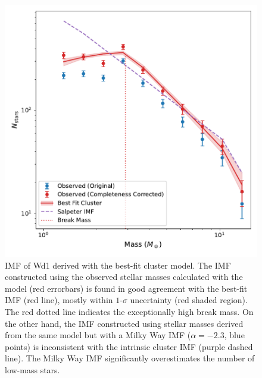 \documentclass[12pt]{ucsddissertation}
\begin{document}
\begin{CJK*}{UTF8}{gbsn}
\begin{figure}[htb!]
    \centering
    \includegraphics[width=0.7\linewidth]{figures/chapter3/IMF.pdf}
    \caption[Initial mass function of Westerlund 1]{IMF of Wd1 derived with the best-fit cluster model. The IMF constructed using the observed stellar masses calculated with the model (red errorbars) is found in good agreement with the best-fit IMF (red line), mostly within $1$-$\sigma$ uncertainty (red shaded region). The red dotted line indicates the exceptionally high break mass. On the other hand, the IMF constructed using stellar masses derived from the same model but with a Milky Way IMF ($\alpha=-2.3$,  blue points) is inconsistent with the intrinsic cluster IMF (purple dashed line). The Milky Way IMF significantly overestimates the number of low-mass stars.}
    \label{fig:imf}
\end{figure}


\end{CJK*}
\end{document}
